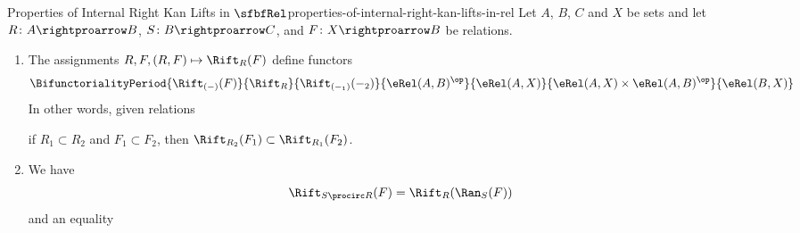 \begin{proposition}{Properties of Internal Right Kan Lifts in $\sfbfRel$}{properties-of-internal-right-kan-lifts-in-rel}%
    Let $A$, $B$, $C$ and $X$ be sets and let $R\colon A\rightproarrow B$, $S\colon B\rightproarrow C$, and $F\colon X\rightproarrow B$ be relations.
    \begin{enumerate}
        \item\label{properties-of-internal-right-kan-lifts-in-rel-functoriality}The assignments $R,F,(R,F)\mapsto\Rift_{R}(F)$ define functors
            \[
                \BifunctorialityPeriod{\Rift_{(-)}(F)}{\Rift_{R}}{\Rift_{(-_{1})}(-_{2})}{\eRel(A,B)^{\op}}{\eRel(A,X)}{\eRel(A,X)\times\eRel(A,B)^{\op}}{\eRel(B,X)}%
            \]%
            In other words, given relations
            \begin{webcompile}
                \qquad
            \end{webcompile}
            if $R_{1}\subset R_{2}$ and $F_{1}\subset F_{2}$, then $\Rift_{R_{2}}(F_{1})\subset\Rift_{R_{1}}(F_{2})$.
        \item\label{properties-of-internal-right-kan-lifts-in-rel-interaction-with-composition}We have
            \[
                \Rift_{S\procirc R}(F)%
                =
                \Rift_{R}(\Ran_{S}(F))%
            \]%
            and an equality
            \begin{webcompile}
                \begin{tikzcd}[row sep={4.0*\the\DL,between origins}, column sep={7.0*\the\DL,between origins}, background color=backgroundColor, ampersand replacement=\&]

\end{tikzcd}
\end{webcompile}
\end{enumerate}
\end{proposition}
